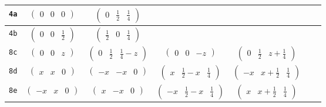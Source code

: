 \documentclass[fleqn,9pt,landscape]{jsarticle}
\begin{document}
\begin{center}
\begin{longtable}{ccccccc}
{\tt 4a} & $ \begin{pmatrix} 0 & 0 & 0 \end{pmatrix} $ & $ \begin{pmatrix} 0 & \frac{1}{2} & \frac{1}{4} \end{pmatrix} $ & $  $ & $  $ & $  $ & $  $ \\ \hline
{\tt 4b} & $ \begin{pmatrix} 0 & 0 & \frac{1}{2} \end{pmatrix} $ & $ \begin{pmatrix} \frac{1}{2} & 0 & \frac{1}{4} \end{pmatrix} $ & $  $ & $  $ & $  $ & $  $ \\ \hline
{\tt 8c} & $ \begin{pmatrix} 0 & 0 & z \end{pmatrix} $ & $ \begin{pmatrix} 0 & \frac{1}{2} & \frac{1}{4} - z \end{pmatrix} $ & $ \begin{pmatrix} 0 & 0 & - z \end{pmatrix} $ & $ \begin{pmatrix} 0 & \frac{1}{2} & z + \frac{1}{4} \end{pmatrix} $ & $  $ & $  $ \\ \hline
{\tt 8d} & $ \begin{pmatrix} x & x & 0 \end{pmatrix} $ & $ \begin{pmatrix} - x & - x & 0 \end{pmatrix} $ & $ \begin{pmatrix} x & \frac{1}{2} - x & \frac{1}{4} \end{pmatrix} $ & $ \begin{pmatrix} - x & x + \frac{1}{2} & \frac{1}{4} \end{pmatrix} $ & $  $ & $  $ \\ \hline
{\tt 8e} & $ \begin{pmatrix} - x & x & 0 \end{pmatrix} $ & $ \begin{pmatrix} x & - x & 0 \end{pmatrix} $ & $ \begin{pmatrix} - x & \frac{1}{2} - x & \frac{1}{4} \end{pmatrix} $ & $ \begin{pmatrix} x & x + \frac{1}{2} & \frac{1}{4} \end{pmatrix} $ & $  $ & $  $ \\ \hline

\end{longtable}
\end{center}
\end{document}
